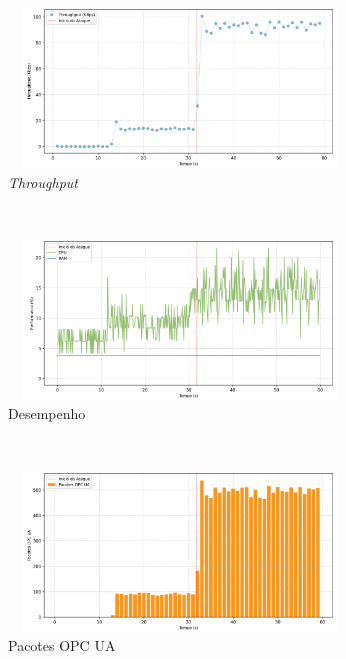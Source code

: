 \begin{apendicesenv}
\begin{figure}[htbp!]
    \centering
    \caption{\label{fig:1-dos_open_multiple_secure_channels}Gráficos do ataque de DoS pela abertura de múltiplos canais seguros - nível de segurança: `Sign'.}
    \begin{subfigure}[t]{0.5\textwidth}
        \centering
        \caption{\textit{Throughput}}
        \includegraphics[width=1\textwidth, height=120pt]{USPSC-img/output/cropped/1-dos_open_multiple_secure_channels-tput.png}
    \end{subfigure}%
    ~ 
    \begin{subfigure}[t]{0.5\textwidth}
        \centering
        \caption{Desempenho}
        \includegraphics[width=1\textwidth, height=120pt]{USPSC-img/output/cropped/1-dos_open_multiple_secure_channels-perf.png}
    \end{subfigure}%
    \\
    \begin{subfigure}[t]{0.5\textwidth}
        \centering
        \caption{Pacotes OPC UA}
        \includegraphics[width=1\textwidth, height=120pt]{USPSC-img/output/cropped/1-dos_open_multiple_secure_channels-pack.png}
    \end{subfigure}%
    ~
    \begin{subfigure}[t]{0.5\textwidth}

\end{subfigure}
\end{figure}
\end{apendicesenv}
